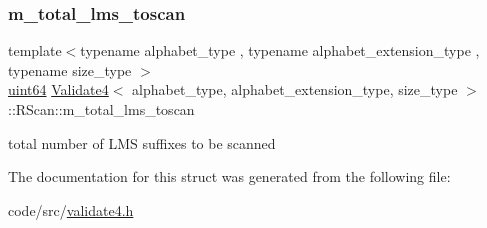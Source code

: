\mbox{\label{struct_validate4_1_1_r_scan_ae61305117585d96877b30800ea2479e4}} 
\subsubsection{\texorpdfstring{m\+\_\+total\+\_\+lms\+\_\+toscan}{m\_total\_lms\_toscan}}
{\footnotesize\ttfamily template$<$typename alphabet\+\_\+type , typename alphabet\+\_\+extension\+\_\+type , typename size\+\_\+type $>$ \\
\hyperlink{types_8h_a60e8696a4678cd348e991a1f172e53f7}{uint64} \hyperlink{class_validate4}{Validate4}$<$ alphabet\+\_\+type, alphabet\+\_\+extension\+\_\+type, size\+\_\+type $>$\+::R\+Scan\+::m\+\_\+total\+\_\+lms\+\_\+toscan\hspace{0.3cm}{\ttfamily [private]}}



total number of L\+MS suffixes to be scanned 



The documentation for this struct was generated from the following file\+:\begin{DoxyCompactItemize}
\item 
code/src/\hyperlink{validate4_8h}{validate4.\+h}\end{DoxyCompactItemize}
